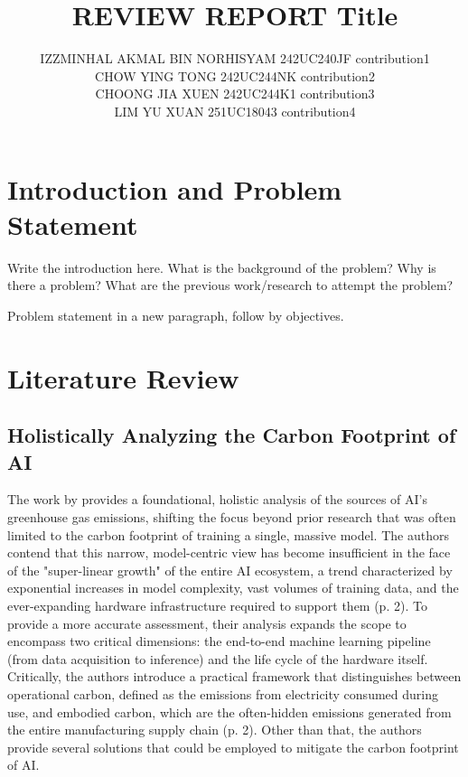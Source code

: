 \documentclass[a4paper, 12pt]{article}
\author{
IZZMINHAL AKMAL BIN NORHISYAM \quad 242UC240JF \quad contribution1 \\
CHOW YING TONG \quad 242UC244NK \quad contribution2\\
CHOONG JIA XUEN \quad 242UC244K1 \quad contribution3\\
LIM YU XUAN \quad 251UC18043 \quad contribution4\\
}
\title{ REVIEW REPORT  Title  }
\begin{document}
\maketitle


\section{Introduction and Problem Statement}
Write the introduction here. What is the background of the problem? Why is there a problem? What are the previous work/research to attempt the problem? 

Problem statement in a new paragraph, follow by objectives.

\section{Literature Review}
\subsection{Holistically Analyzing the Carbon Footprint of AI}
The work by \citet{Wu2022} provides a foundational, holistic analysis of the sources of AI's greenhouse gas emissions, shifting the focus beyond prior research that was often limited to the carbon footprint of training a single, massive model. The authors contend that this narrow, model-centric view has become insufficient in the face of the "super-linear growth" of the entire AI ecosystem, a trend characterized by exponential increases in model complexity, vast volumes of training data, and the ever-expanding hardware infrastructure required to support them (p. 2). To provide a more accurate assessment, their analysis expands the scope to encompass two critical dimensions: the end-to-end machine learning pipeline (from data acquisition to inference) and the life cycle of the hardware itself. Critically, the authors introduce a practical framework that distinguishes between operational carbon, defined as the emissions from electricity consumed during use, and embodied carbon, which are the often-hidden emissions generated from the entire manufacturing supply chain (p. 2). Other than that, the authors provide several solutions that could be employed to mitigate the carbon footprint of AI.
\end{document}
